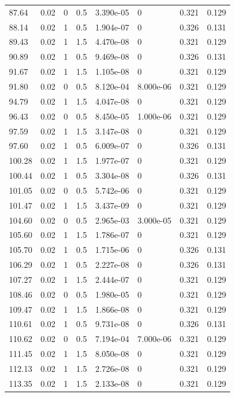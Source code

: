\documentclass[preview]{standalone}
\begin{document}
{{{\begin{tabular}{L{1.2cm}C{1.2cm} C{0.3cm}C{0.5cm} C{1.4cm}C{1.4cm} C{1.4cm}C{1.4cm}}
  87.64  &  0.02  & 0     & 0.5 &  3.390e-05  & 0  & 0.321 &  0.129   \\ 
  88.14  &  0.02  & 1     & 0.5 &  1.904e-07  & 0  & 0.326 &  0.131   \\ 
  89.43  &  0.02  & 1     & 1.5 &  4.470e-08  & 0  & 0.321 &  0.129   \\ 
  90.89  &  0.02  & 1     & 0.5 &  9.469e-08  & 0  & 0.326 &  0.131   \\ 
  91.67  &  0.02  & 1     & 1.5 &  1.105e-08  & 0  & 0.321 &  0.129   \\ 
  91.80  &  0.02  & 0     & 0.5 &  8.120e-04  & 8.000e-06  & 0.321 &  0.129   \\ 
  94.79  &  0.02  & 1     & 1.5 &  4.047e-08  & 0  & 0.321 &  0.129   \\ 
  96.43  &  0.02  & 0     & 0.5 &  8.450e-05  & 1.000e-06  & 0.321 &  0.129   \\ 
  97.59  &  0.02  & 1     & 1.5 &  3.147e-08  & 0  & 0.321 &  0.129   \\ 
  97.60  &  0.02  & 1     & 0.5 &  6.009e-07  & 0  & 0.326 &  0.131   \\ 
  100.28  &  0.02  & 1     & 1.5 &  1.977e-07  & 0  & 0.321 &  0.129   \\ 
  100.44  &  0.02  & 1     & 0.5 &  3.304e-08  & 0  & 0.326 &  0.131   \\ 
  101.05  &  0.02  & 0     & 0.5 &  5.742e-06  & 0  & 0.321 &  0.129   \\ 
  101.47  &  0.02  & 1     & 1.5 &  3.437e-09  & 0  & 0.321 &  0.129   \\ 
  104.60  &  0.02  & 0     & 0.5 &  2.965e-03  & 3.000e-05  & 0.321 &  0.129   \\ 
  105.60  &  0.02  & 1     & 1.5 &  1.786e-07  & 0  & 0.321 &  0.129   \\ 
  105.70  &  0.02  & 1     & 0.5 &  1.715e-06  & 0  & 0.326 &  0.131   \\ 
  106.29  &  0.02  & 1     & 0.5 &  2.227e-08  & 0  & 0.326 &  0.131   \\ 
  107.27  &  0.02  & 1     & 1.5 &  2.444e-07  & 0  & 0.321 &  0.129   \\ 
  108.46  &  0.02  & 0     & 0.5 &  1.980e-05  & 0  & 0.321 &  0.129   \\ 
  109.47  &  0.02  & 1     & 1.5 &  1.866e-08  & 0  & 0.321 &  0.129   \\ 
  110.61  &  0.02  & 1     & 0.5 &  9.731e-08  & 0  & 0.326 &  0.131   \\ 
  110.62  &  0.02  & 0     & 0.5 &  7.194e-04  & 7.000e-06  & 0.321 &  0.129   \\ 
  111.45  &  0.02  & 1     & 1.5 &  8.050e-08  & 0  & 0.321 &  0.129   \\ 
  112.13  &  0.02  & 1     & 1.5 &  2.726e-08  & 0  & 0.321 &  0.129   \\ 
  113.35  &  0.02  & 1     & 1.5 &  2.133e-08  & 0  & 0.321 &  0.129   \\ 
\hline 
\end{tabular} 

}}}
\end{document}
